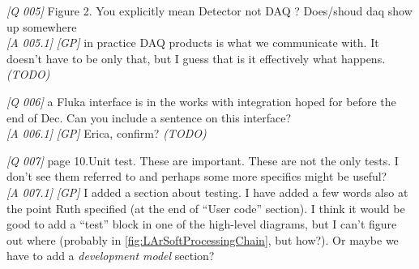 \documentclass{article}
\begin{document}
\emph{{[}Q 005{]}} Figure 2. You explicitly mean Detector not DAQ ?
Does/shoud daq show up somewhere\\
\emph{{[}A 005.1{]}} \emph{{[}GP{]}} in practice DAQ products is what we
communicate with. It doesn't have to be only that, but I guess that is
it effectively what happens. \emph{(TODO)}

\emph{{[}Q 006{]}} a Fluka interface is in the works with integration
hoped for before the end of Dec. Can you include a sentence on this
interface?\\
\emph{{[}A 006.1{]}} \emph{{[}GP{]}} Erica, confirm? \emph{(TODO)}

\emph{{[}Q 007{]}} page 10.Unit test. These are important. These are not
the only tests. I don't see them referred to and perhaps some more
specifics might be useful?\\
\emph{{[}A 007.1{]}} \emph{{[}GP{]}} I added a section about testing. I
have added a few words also at the point Ruth specified (at the end of
``User code'' section). I think it would be good to add a ``test'' block
in one of the high-level diagrams, but I can't figure out where
(probably in \ref{fig:LArSoftProcessingChain}, but how?). Or maybe we
have to add a \emph{development model} section?
\end{document}
